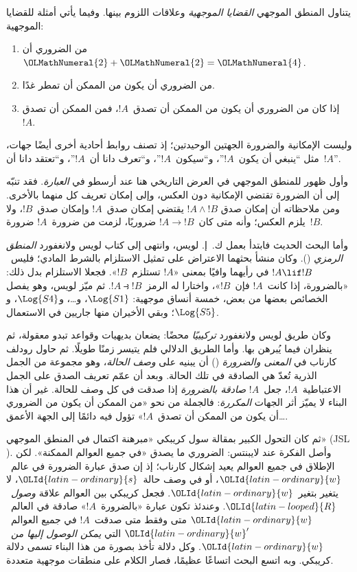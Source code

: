 \documentclass[../../../include/open-logic-section]{subfiles}
\begin{document}


يتناول المنطق الموجهي \emph{القضايا الموجهية} وعلاقات اللزوم بينها.
وفيما يأتي أمثلة للقضايا الموجهية:
\begin{enumerate}
\item من الضروري أن~${\OLMathNumeral{2}}+{\OLMathNumeral{2}}={\OLMathNumeral{4}}$.
\item من الضروري أن يكون من الممكن أن تمطر غدًا.
\item إذا كان من الضروري أن يكون من الممكن أن تصدق~$!A$، فمن الممكن أن تصدق~$!A$.
\end{enumerate}
وليست الإمكانية والضرورة الجهتين الوحيدتين؛ إذ تصنف روابط أحادية أخرى
أيضًا جهات، مثل ``ينبغي أن يكون~$!A$''، و``سيكون~$!A$''، و``تعرف دانا
أن~$!A$''، و``تعتقد دانا أن~$!A$''.

وأول ظهور للمنطق الموجهي في العرض التاريخي هنا عند أرسطو في
\emph{العبارة}. فقد تنبّه إلى أن الضرورة تقتضي الإمكانية دون العكس،
وإلى إمكان تعريف كل منهما بالأخرى. ومن ملاحظاته أن إمكان صدق
$!A \land !B$ يقتضي إمكان صدق~$!A$ وإمكان صدق~$!B$، ولا يلزم
العكس؛ وأنه متى كان~$!A \to !B$ ضروريًا، لزمت من ضرورة~$!A$
ضرورة~$!B$.

وأما البحث الحديث فابتدأ بعمل ك.~إ. لويس، وانتهى إلى كتاب لويس
ولانغفورد \emph{المنطق الرمزي} (). وكان منشأ بحثهما الاعتراض على
تمثيل الاستلزام بالشرط المادي؛ فليس~$!A \lif !B$ في رأيهما وافيًا
بمعنى «$!A$ تستلزم~$!B$». فجعلا الاستلزام بدل ذلك: «بالضرورة،
إذا كانت~$!A$ فإن~$!B$»، واختارا له الرمز~$!A \strictif !B$.
ثم ميّز لويس، وهو يفصل الخصائص بعضها من بعض، خمسة أنساق موجهية:
$\Log{S1}$، و\ldots، و$\Log{S4}$، و$\Log{S5}$؛ وبقي الأخيران
منها جاريين في الاستعمال.

وكان طريق لويس ولانغفورد \emph{تركيبيًا} محضًا: يضعان بديهيات
وقواعد تبدو معقولة، ثم ينظران فيما يُبرهن بها. وأما الطريق الدلالي
فلم يتيسر زمنًا طويلًا. ثم حاول رودلف كارناب في \emph{المعنى والضرورة}
() أن يبنيه على \emph{وصف الحالة}، وهو مجموعة من الجمل الذرية
تُعدّ هي الصادقة في تلك الحالة. وبعد أن عمّم تعريف الصدق على الجمل
الاعتباطية~$!A$، جعل~$!A$ \emph{صادقة بالضرورة} إذا صدقت في كل
وصف للحالة. غير أن هذا البناء لا يميّز أثر الجهات \emph{المكررة}:
فالجملة من نحو «من الممكن أن يكون من الضروري \ldots أن يكون من الممكن أن تصدق~$!A$»
تؤول فيه دائمًا إلى الجهة الأعمق.

ثم كان التحول الكبير بمقالة سول كريبكي «مبرهنة اكتمال في المنطق
الموجهي» (JSL ). وأصل الفكرة عند لايبنتس: الضروري ما يصدق
«في جميع العوالم الممكنة». لكن الإطلاق في جميع العوالم يعيد إشكال
كارناب؛ إذ إن صدق عبارة الضرورة في عالم~${\OLId{latin-ordinary}{w}}$، أو في وصف حالة~${\OLId{latin-ordinary}{s}}$،
لا يتغير بتغير~${\OLId{latin-ordinary}{w}}$. فجعل كريبكي بين العوالم علاقة \emph{وصول}~${\OLId{latin-looped}{R}}$.
وعندئذ تكون عبارة «بالضرورة~$!A$» صادقة في العالم~${\OLId{latin-ordinary}{w}}$ متى وفقط
متى صدقت~$!A$ في جميع العوالم~${\OLId{latin-ordinary}{w}}'$ التي \emph{يمكن الوصول إليها
من}~${\OLId{latin-ordinary}{w}}$. وكل دلالة تأخذ بصورة من هذا البناء تسمى دلالة كريبكي.
وبه اتسع البحث اتساعًا عظيمًا، فصار الكلام على منطقات موجهية متعددة.
\end{document}
